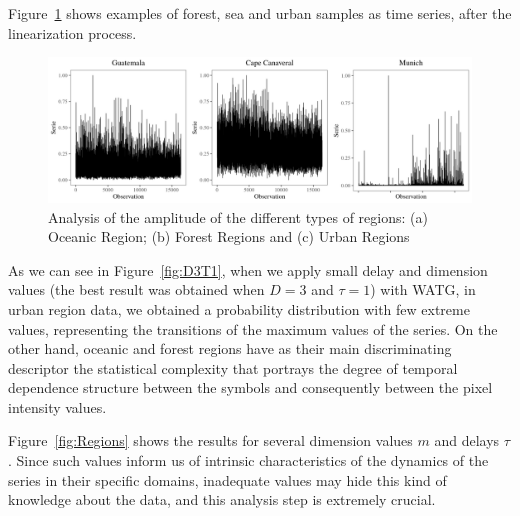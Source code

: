 \documentclass{isprs}
\begin{document}
	
	Figure~\ref{fig:AmplitudeSAR} shows examples of forest, sea and urban samples as time series, after the linearization process.
	
	\begin{figure}[hbt]
		\includegraphics[width=\columnwidth]{Figures/SAR_signal.pdf}
		\caption{Analysis of the amplitude of the different types of regions: (a) Oceanic Region; (b) Forest Regions and (c) Urban Regions}
		\label{fig:AmplitudeSAR}
	\end{figure}
	
	
	As we can see in Figure~\ref{fig:D3T1}, when we apply small delay and dimension values (the best result was obtained when $D = 3$ and $\tau = 1$) with WATG, in urban region data, we obtained a probability distribution with few extreme values, representing the transitions of the maximum values of the series.
	On the other hand, oceanic and forest regions have as their main discriminating descriptor the statistical complexity that portrays the degree of temporal dependence structure between the symbols and consequently between the pixel intensity values.
	
	Figure~\ref{fig:Regions} shows the results for several dimension values $m$ and delays $\tau$.
	Since such values inform us of intrinsic characteristics of the dynamics of the series in their specific domains, inadequate values may hide this kind of knowledge about the data, and this analysis step is extremely crucial.
	
\end{document}
